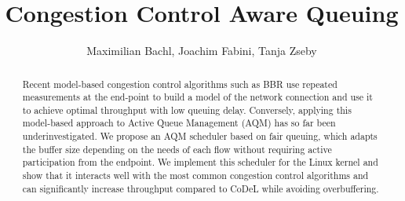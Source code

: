 \documentclass[10pt,sigconf,letterpaper,dvipsnames\ifx\removeHeaders\tempYes ,nonacm\fi]{acmart}
\begin{document}
\title{Congestion Control Aware Queuing}



\begin{abstract}
Recent model-based congestion control algorithms such as BBR use repeated measurements at the end-point to build a model of the network connection and use it to achieve optimal throughput with low queuing delay. Conversely, applying this model-based approach to Active Queue Management (AQM) has so far been underinvestigated. We propose an AQM scheduler based on fair queuing, which adapts the buffer size depending on the needs of each flow without requiring active participation from the endpoint. We implement this scheduler for the Linux kernel and show that it interacts well with the most common congestion control algorithms and can significantly increase throughput compared to CoDeL while avoiding overbuffering.
\end{abstract}

\author{Maximilian Bachl, Joachim Fabini, Tanja Zseby}



\end{document}

